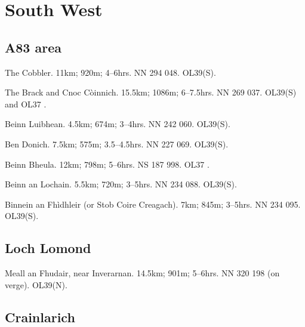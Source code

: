 \section{South West}



\subsection{A83 area}

\begin{munros}
\item
The Cobbler.  11km; 920m; 4--6hrs.  NN 294 048.  OL39(S). 

\item
The Brack and Cnoc Còinnich.  15.5km; 1086m; 6--7.5hrs. NN 269 037. OL39(S) and OL37 \buy.

\item
Beinn Luibhean.  4.5km; 674m; 3--4hrs.  NN 242 060.  OL39(S). 

\item
Ben Donich.  7.5km; 575m; 3.5--4.5hrs.  NN 227 069.  OL39(S). 

\item
Beinn Bheula.  12km; 798m; 5--6hrs.  NS 187 998.  OL37 \buy. 

\item
Beinn an Lochain.  5.5km; 720m; 3--5hrs. NN 234 088. OL39(S).

\item Binnein an Fhìdhleir (or Stob Coire Creagach).  7km; 845m; 3--5hrs.  NN
  234 095.  OL39(S).
\end{munros}


\subsection{Loch Lomond}

\begin{munros}
\item
Meall an Fhudair, near Inverarnan.  14.5km; 901m; 5--6hrs. NN 320 198 (on
verge).  OL39(N).  \tick
\end{munros}



\subsection{Crainlarich}

